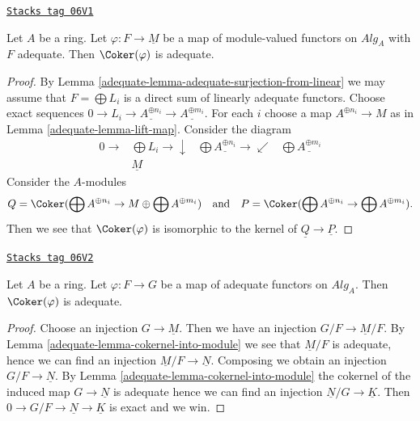 \begin{lemma}
\label{adequate-lemma-cokernel-into-module}
\href{https://stacks.math.columbia.edu/tag/06V1}{\texttt{Stacks tag 06V1}}

Let $A$ be a ring.
Let $\varphi : F \to \underline{M}$ be a map of module-valued functors
on $\textit{Alg}_A$ with $F$ adequate.
Then $\Coker(\varphi)$ is adequate.
\end{lemma}

\begin{proof}

By
Lemma \ref{adequate-lemma-adequate-surjection-from-linear}
we may assume that $F = \bigoplus L_i$ is a direct sum of linearly adequate
functors. Choose exact sequences
$0 \to L_i \to \underline{A^{\oplus n_i}} \to \underline{A^{\oplus m_i}}$.
For each $i$ choose a map $A^{\oplus n_i} \to M$ as in
Lemma \ref{adequate-lemma-lift-map}.
Consider the diagram
$$
\begin{array}{cccc}0 \longrightarrow & \bigoplus L_i  \longrightarrow\downarrow & \bigoplus \underline{A^{\oplus n_i}} \longrightarrow\swarrow & \bigoplus \underline{A^{\oplus m_i}} \\  & \underline{M} &  & \end{array}
$$
Consider the $A$-modules
$$
Q =
\Coker(\bigoplus A^{\oplus n_i} \to M \oplus \bigoplus A^{\oplus m_i})
\quad\text{and}\quad
P = \Coker(\bigoplus A^{\oplus n_i} \to \bigoplus A^{\oplus m_i}).
$$
Then we see that $\Coker(\varphi)$ is isomorphic to the
kernel of $\underline{Q} \to \underline{P}$.
\end{proof}

\begin{lemma}
\label{adequate-lemma-cokernel-adequate}
\href{https://stacks.math.columbia.edu/tag/06V2}{\texttt{Stacks tag 06V2}}


Let $A$ be a ring.
Let $\varphi : F \to G$ be a map of adequate functors on $\textit{Alg}_A$.
Then $\Coker(\varphi)$ is adequate.
\end{lemma}

\begin{proof}

Choose an injection $G \to \underline{M}$.
Then we have an injection $G/F \to \underline{M}/F$. By
Lemma \ref{adequate-lemma-cokernel-into-module}
we see that $\underline{M}/F$ is adequate, hence we can find an injection
$\underline{M}/F \to \underline{N}$.
Composing we obtain an injection $G/F \to \underline{N}$. By
Lemma \ref{adequate-lemma-cokernel-into-module}
the cokernel of the induced map $G \to \underline{N}$ is adequate
hence we can find an injection $\underline{N}/G \to \underline{K}$.
Then $0 \to G/F \to \underline{N} \to \underline{K}$ is exact and
we win.
\end{proof}

